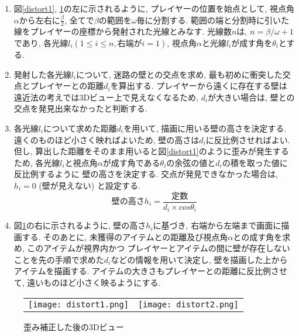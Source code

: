 \documentclass[10pt]{jsarticle}
\begin{document}
\begin{enumerate}[手順(1)]
\item	図\ref{distort1}, \ref{distort2}の左に示されるように, 
		プレイヤーの位置を始点として, 視点角$\alpha$から左右に$\frac{\beta}{2}$, 
		全てで$\beta$の範囲を$\omega$毎に分割する. 
		範囲の端と分割時に引いた線をプレイヤーの座標から発射された光線とみなす.
		光線数$n$は, $n = \beta/\omega + 1$であり, 各光線$l_i ( 1 \leq i \leq n , 右端がi=1)$, 
		視点角$\alpha$と光線$l_i$が成す角を$\theta_i$とする.
\item	発射した各光線$l_i$について, 迷路の壁との交点を求め, 最も初めに衝突した交点とプレイヤーとの距離$d_i$を算出する.
		プレイヤーから遠くに存在する壁は遠近法の考えでは3Dビュー上で見えなくなるため, 
		$d_i$が大きい場合は, 壁との交点を発見出来なかったと判断する.
\item	各光線$l_i$について求めた距離$d_i$を用いて, 描画に用いる壁の高さを決定する.
		遠くのものほど小さく映ればよいため, 壁の高さは$d_i$に反比例させればよい.
		但し, 算出した距離をそのまま用いると図\ref{distort1}のように歪みが発生するため, 
		各光線$l_i$と視点角$\alpha$が成す角である$\theta_i$の余弦の値と$d_i$の積を取った値に反比例するように
		壁の高さを決定する.
		交点が発見できなかった場合は, $h_i = 0 $ (壁が見えない) と設定する.
		\begin{equation*}
		壁の高さ h_i = \frac{定数}{d_i \times cos\theta_i}
		\end{equation*}
\item	図\ref{distort2}の右に示されるように, 壁の高さ$h_i$に基づき, 右端から左端まで画面に描画する.
		そのあとに, 未獲得のアイテムとの距離及び視点角$\alpha$との成す角を求め, このアイテムが視界内かつ
		プレイヤーとアイテムの間に壁が存在しないことを先の手順で求めた$d_i$などの情報を用いて決定し, 
		壁を描画した上からアイテムを描画する.
		アイテムの大きさもプレイヤーとの距離に反比例させて, 遠いものほど小さく映るようにする.
\end{enumerate}

\begin{figure}[h]
	\begin{tabular}{cc}
	\begin{minipage}[t]{0.49\textwidth}
		\centering
		\texttt{[image: distort1.png]}
		\caption{前面に壁がある場合の歪み}
 		\label{distort1}
	\end{minipage} &
	\begin{minipage}[t]{0.49\textwidth}
		\centering
		\texttt{[image: distort2.png]}
		\caption{歪み補正した後の3Dビュー}
	 	\label{distort2}
	\end{minipage}
	\end{tabular}
\end{figure}
\end{document}
